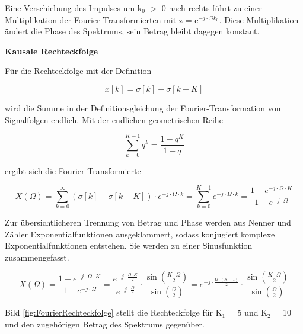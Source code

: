 \noindent Eine Verschiebung des Impulses um k${}_{0}$ $\mathrm{>}$ 0 nach rechts f\"{u}hrt zu einer Multiplikation der Fourier-Transformierten mit z = e${}^{-j\cdot \Omega k_{0}}$. Diese Multiplikation \"{a}ndert die Phase des Spektrums, sein Betrag bleibt dagegen konstant.\bigskip

{\selectfont
\noindent\textbf{Kausale Rechteckfolge}}\smallskip

\noindent F\"{u}r die Rechteckfolge mit der Definition

\begin{equation}\label{eq:seventwenty}
x\left[k\right]=\sigma \left[k\right]-\sigma \left[k-K\right]
\end{equation}

\noindent wird die Summe in der Definitionsgleichung der Fourier-Transformation von Signalfolgen endlich. Mit der endlichen geometrischen Reihe 

\begin{equation}\label{eq:seventwentyone}
\sum _{k=0}^{K-1}q^{k}  =\frac{1-q^{K} }{1-q}
\end{equation}

\noindent ergibt sich die Fourier-Transformierte

\begin{equation}\label{eq:seventwentytwo}
X\left(\Omega \right)=\sum _{k=0}^{\infty }\left(\sigma \left[k\right]-\sigma \left[k-K\right]\right)\cdot e^{-j\cdot \Omega \cdot k}  =\sum _{k=0}^{K-1}e^{-j\cdot \Omega \cdot k}  =\frac{1-e^{-j\cdot \Omega \cdot K} }{1-e^{-j\cdot \Omega }}
\end{equation}

\noindent Zur \"{u}bersichtlicheren Trennung von Betrag und Phase werden aus Nenner und Z\"{a}hler Exponentialfunktionen ausgeklammert, sodass konjugiert komplexe Exponentialfunktionen entstehen. Sie werden zu einer Sinusfunktion zusammengefasst. 

\begin{equation}\label{eq:seventwentythree}
X\left(\Omega \right)=\frac{1-e^{-j\cdot \Omega \cdot K} }{1-e^{-j\cdot \Omega } } =\frac{e^{-j\cdot \frac{\Omega \cdot K}{2} } }{e^{-j\cdot \frac{\Omega }{2} } } \cdot \frac{\sin \left(\frac{K\cdot \Omega }{2} \right)}{\sin \left(\frac{\Omega }{2} \right)} =e^{-j\cdot \frac{\Omega \cdot \left(K-1\right)}{2} } \cdot \frac{\sin \left(\frac{K\cdot \Omega }{2} \right)}{\sin \left(\frac{\Omega }{2} \right)}
\end{equation}

\noindent Bild \ref{fig:FourierRechteckfolge} stellt die Rechteckfolge f\"{u}r K${}_{1}$ = 5 und K${}_{2}$ = 10 und den zugeh\"{o}rigen Betrag des Spektrums gegen\"{u}ber.

